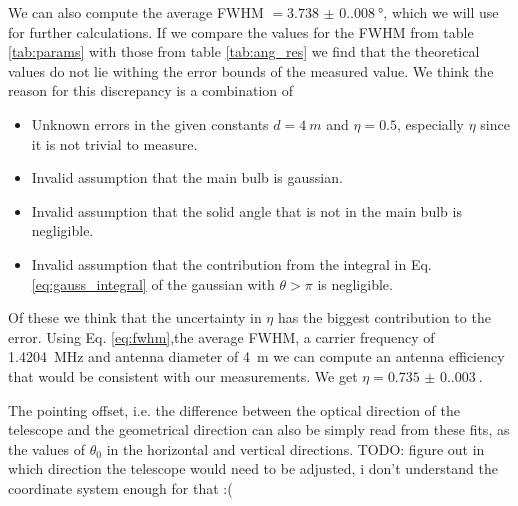 We can also compute the average FWHM $= \SI{3.738(0.008)}{\degree}$, which we will use for further calculations.
If we compare the values for the FWHM from table \ref{tab:params} with those from table \ref{tab:ang_res}
we find that the theoretical values do not lie withing the error bounds of the measured value.
We think the reason for this discrepancy is a combination of
\begin{itemize}
    \item Unknown errors in the given constants $d = \SI{4}{m}$ and $\eta = 0.5$, especially $\eta$ since it is not trivial to measure.
    \item Invalid assumption that the main bulb is gaussian.
    \item Invalid assumption that the solid angle that is not in the main bulb is negligible.
    \item Invalid assumption that the contribution from the integral in Eq. \eqref{eq:gauss_integral} of the gaussian with $\theta > \pi$ is negligible.
\end{itemize}
Of these we think that the uncertainty in $\eta$ has the biggest contribution to the error. Using Eq. \eqref{eq:fwhm},the average FWHM, a carrier frequency of \SI{1.4204}{\mega \hertz} and antenna diameter of \SI{4}{m}
we can compute an antenna efficiency that would be consistent with our measurements. We get $\eta = \SI{0.735(0.003)}{}$.

The pointing offset, i.e. the difference between the optical direction of the telescope and the geometrical direction can also be simply read from these fits, as the values of $\theta_0$ in the horizontal and vertical directions.
TODO: figure out in which direction the telescope would need to be adjusted, i don't understand the coordinate system enough for that :(